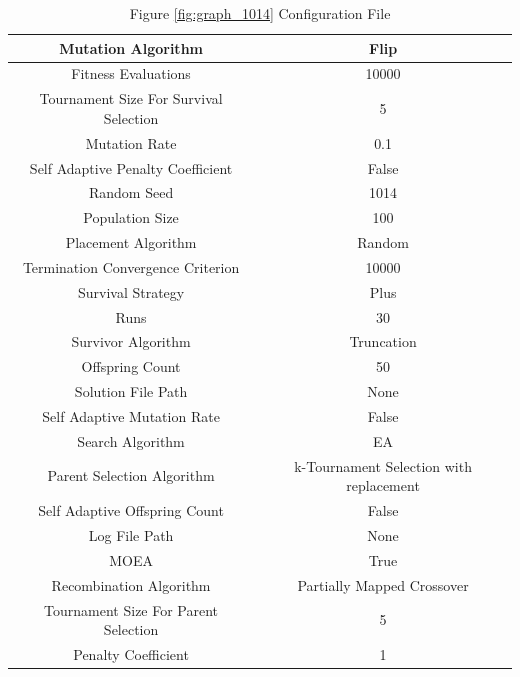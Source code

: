 \documentclass{standalone}
\begin{document}
\begin{table}[!htb]
	\centering
	\caption{Figure \ref{fig:graph_1014} Configuration File}
	\label{tab:graph_1014}
	\begin{tabular}{| c | c |}
		\hline
		Mutation Algorithm		& Flip		 \\
		\hline
		Fitness Evaluations		& 10000		 \\
		\hline
		Tournament Size For Survival Selection		& 5		 \\
		\hline
		Mutation Rate		& 0.1		 \\
		\hline
		Self Adaptive Penalty Coefficient		& False		 \\
		\hline
		Random Seed		& 1014		 \\
		\hline
		Population Size		& 100		 \\
		\hline
		Placement Algorithm		& Random		 \\
		\hline
		Termination Convergence Criterion		& 10000		 \\
		\hline
		Survival Strategy		& Plus		 \\
		\hline
		Runs		& 30		 \\
		\hline
		Survivor Algorithm		& Truncation		 \\
		\hline
		Offspring Count		& 50		 \\
		\hline
		Solution File Path		& None		 \\
		\hline
		Self Adaptive Mutation Rate		& False		 \\
		\hline
		Search Algorithm		& EA		 \\
		\hline
		Parent Selection Algorithm		& k-Tournament Selection with replacement		 \\
		\hline
		Self Adaptive Offspring Count		& False		 \\
		\hline
		Log File Path		& None		 \\
		\hline
		MOEA		& True		 \\
		\hline
		Recombination Algorithm		& Partially Mapped Crossover		 \\
		\hline
		Tournament Size For Parent Selection		& 5		 \\
		\hline
		Penalty Coefficient		& 1		 \\
		\hline
	\end{tabular}
\end{table}
\end{document}

